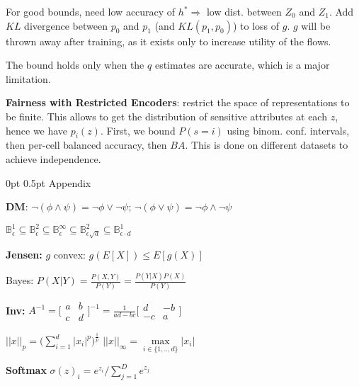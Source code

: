 \documentclass[11pt,landscape,a4paper,fleqn]{article}
\makeatletter
\renewcommand{\section}{\@startsection{section}{1}{0mm}%
                                {0pt}%
                                {0.5pt}%
                                {\color{myorange}\sffamily\small\bfseries}}
\newcommand{\mhl}[1]{#1}
\makeatother
\begin{document}
\begin{multicols*}{4}
For good bounds, need low accuracy of \(h^* \Rightarrow\) low dist. between \(Z_0\) and \(Z_1\).
Add \(KL\) divergence between \(p_0\) and \(p_1\) (and \(KL(p_1, p_0)\)) to loss of \(g\).
\(g\) will be thrown away after training, as it exists only to increase utility of the flows.

The bound holds only when the \(q\) estimates are accurate, which is a major limitation.

\textbf{Fairness with Restricted Encoders}: restrict the space of representations to be finite.
This allows to get the distribution of sensitive attributes at each \(z\), hence we have \(p_i(z)\).
First, we bound \(P(s = i)\) using binom. conf. intervals,
then per-cell balanced accuracy, then \(BA\). This is done on different datasets to achieve independence.

\section{Appendix}

\textbf{DM}: $\lnot(\phi \land \psi) = \lnot \phi \lor \lnot \psi$;
$\lnot(\phi \lor \psi) = \lnot \phi \land \lnot \psi$

$\mathbb{B}_\epsilon^1 \subseteq \mathbb{B}_\epsilon^2 \subseteq \mathbb{B}_\epsilon^\infty \subseteq \mathbb{B}_{\epsilon \sqrt{d}}^{2} \subseteq \mathbb{B}_{\epsilon \cdot d}^1$

\textbf{Jensen: }$g$ convex: $g(E[X]) \leq E[g(X)]$


Bayes: \mhl{$P(X|Y) = \frac{P(X,Y)}{P(Y)} = \frac{P(Y|X)P(X)}{P(Y)}$}

\textbf{Inv:} $A^{-1}=
\big[
\begin{smallmatrix}
a&b \\ 
c&d
\end{smallmatrix}\big]^{-1}=
\frac{1}{ad-bc}
\big[
\begin{smallmatrix}
d&-b \\ 
-c&a
\end{smallmatrix}\big]
$

$||x||_p = \big( \sum_{i=1}^d |x_i|^p \big)^{\frac{1}{p}}$ \quad $||x||_\infty = \max\limits_{i \in \{1,..,d\}} |x_i|$

\vspace*{-3mm}
\textbf{Softmax} $\sigma(z)_i = e^{z_i} / \sum_{j=1}^{D} e^{z_j}$


\end{multicols*}
\end{document}

